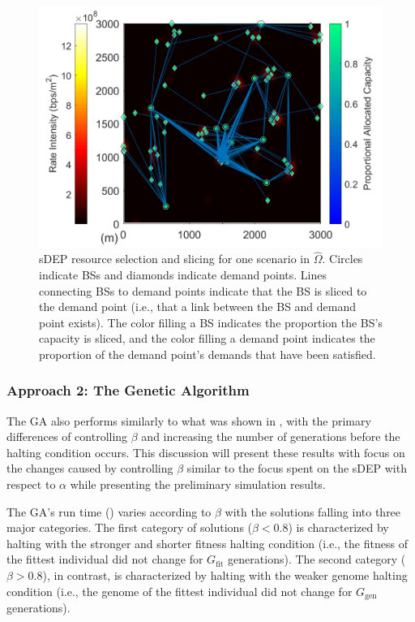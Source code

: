 \documentclass[12pt,dvipsnames]{report}
\begin{document}
\begin{figure}[htp]
	\centering
	\includegraphics[height=0.4\textheight]{Figures/CaseI_VoronoiDemandAllocation_sDEP_10BS}
	\caption[One sDEP resource selection and slicing solution for Case I]{sDEP resource selection and slicing for one scenario in $\hat{\Omega}$.  Circles indicate BSs and diamonds indicate demand points.  Lines connecting BSs to demand points indicate that the BS is sliced to the demand point (i.e., that a link between the BS and demand point exists).  The color filling a BS indicates the proportion the BS's capacity is sliced, and the color filling a demand point indicates the proportion of the demand point's demands that have been satisfied.}
	\label{fig:CaseI_VoronoiDemandAllocation_sDEP}
\end{figure}

\subsubsection{Approach 2: The Genetic Algorithm}

The GA also performs similarly to what was shown in , with the primary differences of controlling $\beta$ and increasing the number of generations before the halting condition occurs.  This discussion will present these results with focus on the changes caused by controlling $\beta$ similar to the focus spent on the sDEP with respect to $\alpha$ while presenting the preliminary simulation results.

The GA's run time () varies according to $\beta$ with the solutions falling into three major categories.  The first category of solutions ($\beta < 0.8$) is characterized by halting with the stronger and shorter fitness halting condition (i.e., the fitness of the fittest individual did not change for $G_{\text{fit}}$ generations).  The second category ($\beta > 0.8$), in contrast, is characterized by halting with the weaker genome halting condition (i.e., the genome of the fittest individual did not change for $G_{\text{gen}}$ generations).
\end{document}
